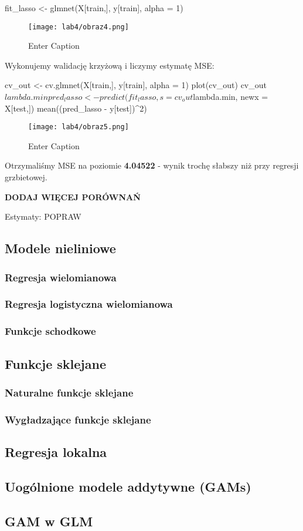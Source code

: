 \begin{Rcode}
fit_lasso <- glmnet(X[train,], y[train], alpha = 1)
\end{Rcode}

\begin{figure}[H]
    \centering
    \texttt{[image: lab4/obraz4.png]}
    \caption{Enter Caption}
    \label{fig:enter-label}
\end{figure}

Wykonujemy walidację krzyżową i liczymy estymatę MSE:

\begin{Rcode}
cv_out <- cv.glmnet(X[train,], y[train], alpha = 1)
plot(cv_out)
cv_out$lambda.min
pred_lasso <- predict(fit_lasso, s = cv_out$lambda.min, newx = X[test,])
mean((pred_lasso - y[test])^2)
\end{Rcode}

\begin{figure}[H]
    \centering
    \texttt{[image: lab4/obraz5.png]}
    \caption{Enter Caption}
    \label{fig:enter-label}
\end{figure}

Otrzymaliśmy MSE na poziomie \textbf{4.04522} - wynik trochę słabszy niż przy regresji grzbietowej.

\textbf{DODAJ WIĘCEJ PORÓWNAŃ}

Estymaty:
POPRAW

\subsection{Modele nieliniowe}
\subsubsection{Regresja wielomianowa}
\subsubsection{Regresja logistyczna wielomianowa}
\subsubsection{Funkcje schodkowe}
\subsection{Funkcje sklejane}
\subsubsection{Naturalne funkcje sklejane}
\subsubsection{Wygładzające funkcje sklejane}
\subsection{Regresja lokalna}
\subsection{Uogólnione modele addytywne (GAMs)}
\subsection{GAM w GLM}